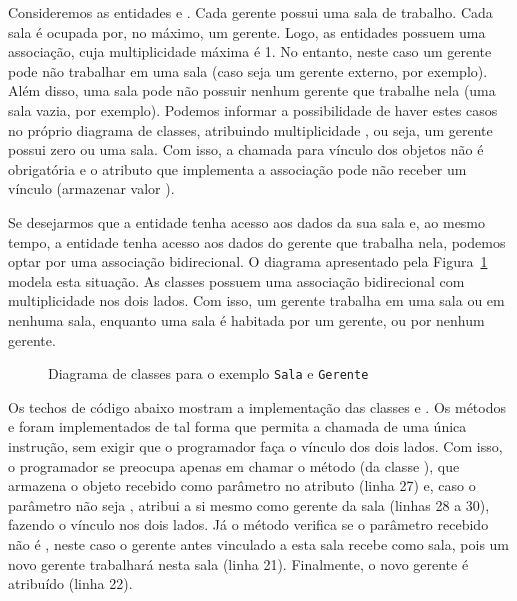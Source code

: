 Consideremos as entidades  e . Cada gerente possui uma sala de trabalho. Cada sala é ocupada por, no máximo, um gerente. Logo, as entidades possuem uma associação, cuja multiplicidade máxima é 1. No entanto, neste caso um gerente pode não trabalhar em uma sala (caso seja um gerente externo, por exemplo). Além disso, uma sala pode não possuir nenhum gerente que trabalhe nela (uma sala vazia, por exemplo). Podemos informar a possibilidade de haver estes casos no próprio diagrama de classes, atribuindo multiplicidade , ou seja, um gerente possui zero ou uma sala. Com isso, a chamada para vínculo dos objetos não é obrigatória e o atributo que implementa a associação pode não receber um vínculo (armazenar valor ).

Se desejarmos que a entidade  tenha acesso aos dados da sua sala e, ao mesmo tempo, a entidade  tenha acesso aos dados do gerente que trabalha nela, podemos optar por uma associação bidirecional. O diagrama apresentado pela Figura~\ref{fig:gerente-sala} modela esta situação. As classes possuem uma associação bidirecional com multiplicidade  nos dois lados. Com isso, um gerente trabalha em uma sala ou em nenhuma sala, enquanto uma sala é habitada por um gerente, ou por nenhum gerente.

\begin{figure}[h]
	\centering
	
	
	\caption{Diagrama de classes para o exemplo \texttt{Sala} e \texttt{Gerente}}
	\label{fig:gerente-sala}
\end{figure}

Os techos de código abaixo mostram a implementação das classes  e . Os métodos  e  foram implementados de tal forma que permita a chamada de uma única instrução, sem exigir que o programador faça o vínculo dos dois lados. Com isso, o programador se preocupa apenas em chamar o método  (da classe ), que armazena o objeto recebido como parâmetro no atributo  (linha 27) e, caso o parâmetro não seja , atribui a si mesmo como gerente da sala (linhas 28 a 30), fazendo o vínculo nos dois lados. Já o método  verifica se o parâmetro recebido não é , neste caso o gerente antes vinculado a esta sala recebe  como sala, pois um novo gerente trabalhará nesta sala (linha 21). Finalmente, o novo gerente é atribuído (linha 22).
 
